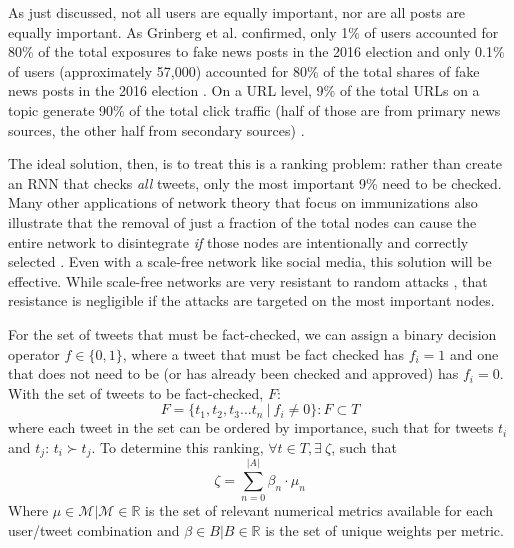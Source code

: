 \documentclass[preprint,review,12pt]{elsarticle}
\begin{document}
 As just discussed, not all users are equally important, nor are all posts are equally important. As Grinberg et al. confirmed, only 1\% of users accounted for 80\% of the total exposures to fake news posts in the 2016 election and only 0.1\% of users (approximately 57,000) accounted for 80\% of the total shares of fake news posts in the 2016 election \cite{grinberg2019fake}. %
 On a URL level, 9\% of the total URLs on a topic generate 90\% of the total click traffic (half of those are from primary news sources, the other half from secondary sources) \cite{gabielkov2016social}. 
 
 The ideal solution, then, is to treat this is a ranking problem: rather than create an RNN that checks \textit{all} tweets, only the most important 9\% need to be checked. Many other applications of network theory that focus on immunizations also illustrate that the removal of just a fraction of the total nodes can cause the entire network to disintegrate \textit{if} those nodes are intentionally and correctly selected  \cite{albert2000error,cohen2003efficient,helleringer2007sexual,cohen2001breakdown,hethcote2014gonorrhea}. Even with a scale-free network like social media, this solution will be effective. While scale-free networks are very resistant to random attacks \cite{albert2000error,callaway2000network,cohen2000resilience}, that resistance is negligible if the attacks are targeted on the most important nodes.
 
 For the set of tweets that must be fact-checked, we can assign a binary decision operator $f \in \{0,1\}$, where a tweet that must be fact checked has $f_i = 1$ and one that does not need to be (or has already been checked and approved) has $f_i = 0$. With the set of tweets to be fact-checked, $F$:
 \begin{equation}
 \label{Factcheckset}
 F=\{t_1, t_2, t_3 ... t_n \ |\ f_i \neq 0\}: F \subset T
 \end{equation}
 where each tweet in the set can be ordered by importance, such that for tweets $t_i$ and $t_j$: $t_i \succ t_j$. To determine this ranking, $\forall t \in T, \exists \  \zeta$, such that 
 \begin{equation}
    \label{zeta function}
     \zeta = \sum_{n=0}^{|A|} \beta_{n} \cdot \mu_{n}
 \end{equation}
 Where $\mu \in \mathcal{M} | \mathcal{M} \in \mathbb{R}$ is the set of relevant numerical metrics available for each user/tweet combination and $\beta \in B| B \in \mathbb{R}$ is the set of unique weights per metric. 
 
\end{document}
